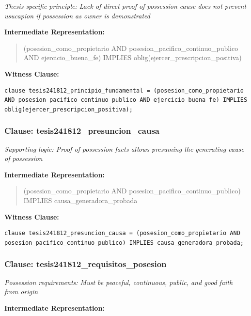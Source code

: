 \documentclass[11pt,a4paper]{article}
\begin{document}
\textit{Thesis-specific principle: Lack of direct proof of possession cause does not prevent usucapion if possession as owner is demonstrated}

\textbf{Intermediate Representation:}

\begin{quote}
(posesion\_como\_propietario AND posesion\_pacifico\_continuo\_publico AND ejercicio\_buena\_fe) IMPLIES oblig(ejercer\_prescripcion\_positiva)
\end{quote}

\textbf{Witness Clause:}

\begin{lstlisting}[style=witnessstyle, language=Witness]
clause tesis241812_principio_fundamental = (posesion_como_propietario AND posesion_pacifico_continuo_publico AND ejercicio_buena_fe) IMPLIES oblig(ejercer_prescripcion_positiva);
\end{lstlisting}

\subsubsection{Clause: tesis241812\_presuncion\_causa}

\textit{Supporting logic: Proof of possession facts allows presuming the generating cause of possession}

\textbf{Intermediate Representation:}

\begin{quote}
(posesion\_como\_propietario AND posesion\_pacifico\_continuo\_publico) IMPLIES causa\_generadora\_probada
\end{quote}

\textbf{Witness Clause:}

\begin{lstlisting}[style=witnessstyle, language=Witness]
clause tesis241812_presuncion_causa = (posesion_como_propietario AND posesion_pacifico_continuo_publico) IMPLIES causa_generadora_probada;
\end{lstlisting}

\subsubsection{Clause: tesis241812\_requisitos\_posesion}

\textit{Possession requirements: Must be peaceful, continuous, public, and good faith from origin}

\textbf{Intermediate Representation:}
\end{document}

